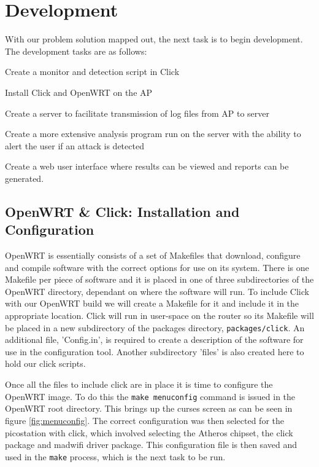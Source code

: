 \chapter{Development}

With our problem solution mapped out, the next task is to begin development. The development tasks are as follows:
\begin{itemize*}
\item Create a monitor and detection script in Click
\item Install Click and OpenWRT on the AP
\item Create a server to facilitate transmission of log files from AP to server
\item Create a more extensive analysis program run on the server with the ability to alert the user if an attack is detected
\item Create a web user interface where results can be viewed and reports can be generated.
\end{itemize*}

\section{OpenWRT \& Click: Installation and Configuration}
OpenWRT is essentially consists of a set of Makefiles that download, configure and compile software with the correct options for use on its system. There is one Makefile per piece of software and it is placed in one of three subdirectories of the OpenWRT directory, dependant on where the software will run. To include Click with our OpenWRT build we will create a Makefile for it and include it in the appropriate location. Click will run in user-space on the router so its Makefile will be placed in a new subdirectory of the packages directory, \texttt{packages/click}. An additional file, 'Config.in', is required to create a description of the software for use in the configuration tool\cite{openwrt}. Another subdirectory 'files' is also created here to hold our click scripts. 

Once all the files to include click are in place it is time to configure the OpenWRT image. To do this the \texttt{make menuconfig} command is issued in the OpenWRT root directory. This brings up the curses screen as can be seen in figure \ref{fig:menuconfig}. The correct configuration was then selected for the picostation with click, which involved selecting the Atheros chipset, the click package and madwifi driver package. This configuration file is then saved and used in the \texttt{make} process, which is the next task to be run.

